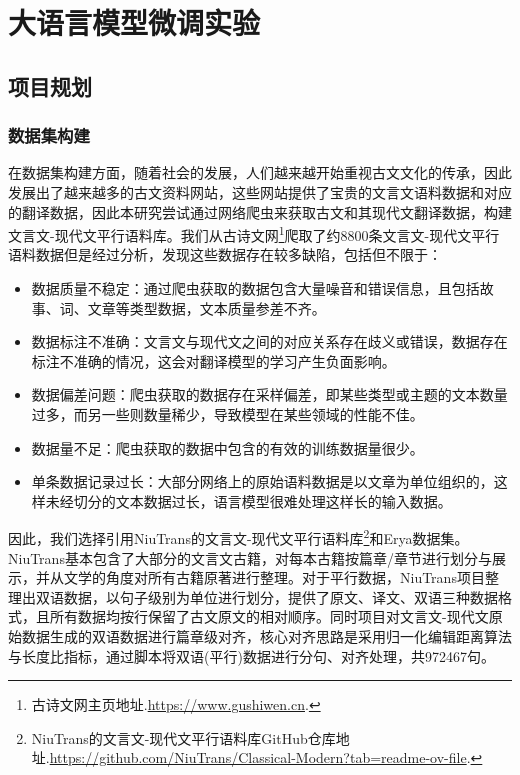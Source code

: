 \documentclass[
    decl-page,  %
    ,fontset = win, %
  ]{njuthesis}
\begin{document}
\chapter{大语言模型微调实验}
\section{项目规划}
\subsection{数据集构建}
在数据集构建方面，随着社会的发展，人们越来越开始重视古文文化的传承，因此发展出了越来越多的古文资料网站，这些网站提供了宝贵的文言文语料数据和对应的翻译数据，因此本研究尝试通过网络爬虫来获取古文和其现代文翻译数据，构建文言文-现代文平行语料库。我们从古诗文网\footnote{古诗文网主页地址.\url{https://www.gushiwen.cn}.}爬取了约8800条文言文-现代文平行语料数据但是经过分析，发现这些数据存在较多缺陷，包括但不限于：

\begin{itemize}
    \item 数据质量不稳定：通过爬虫获取的数据包含大量噪音和错误信息，且包括故事、词、文章等类型数据，文本质量参差不齐。
    \item 数据标注不准确：文言文与现代文之间的对应关系存在歧义或错误，数据存在标注不准确的情况，这会对翻译模型的学习产生负面影响。
    \item 数据偏差问题：爬虫获取的数据存在采样偏差，即某些类型或主题的文本数量过多，而另一些则数量稀少，导致模型在某些领域的性能不佳。
    \item 数据量不足：爬虫获取的数据中包含的有效的训练数据量很少。
    \item 单条数据记录过长：大部分网络上的原始语料数据是以文章为单位组织的，这样未经切分的文本数据过长，语言模型很难处理这样长的输入数据。
\end{itemize}

因此，我们选择引用NiuTrans的文言文-现代文平行语料库\footnote{NiuTrans的文言文-现代文平行语料库GitHub仓库地址.\url{https://github.com/NiuTrans/Classical-Modern?tab=readme-ov-file}.}和Erya数据集\cite{guo2023towards}。NiuTrans基本包含了大部分的文言文古籍，对每本古籍按篇章/章节进行划分与展示，并从文学的角度对所有古籍原著进行整理。对于平行数据，NiuTrans项目整理出双语数据，以句子级别为单位进行划分，提供了原文、译文、双语三种数据格式，且所有数据均按行保留了古文原文的相对顺序。同时项目对文言文-现代文原始数据生成的双语数据进行篇章级对齐，核心对齐思路是采用归一化编辑距离算法与长度比指标，通过脚本将双语(平行)数据进行分句、对齐处理，共972467句。
\end{document}

